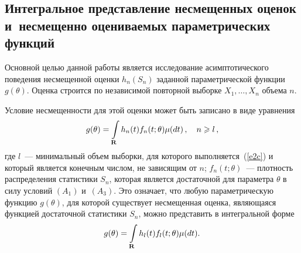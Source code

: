 \begin{multicols}{2}
\section{Интегральное представление несмещенных оценок
и~несмещенно оцениваемых параметрических функций}

  Основной целью данной работы является исследование
  асимптотического поведения несмещенной оценки $h_n(S_n)$ заданной
  параметрической функции $g(\theta)$. Оценка  строится по
  независимой повторной выборке $X_1,\ldots,X_n$ объема $n$.

   Условие несмещенности для этой оценки может быть записано
  в виде уравнения
\begin{equation}
g(\theta)=\int\limits_{\bf R} h_n(t) f_n(t;\theta) \mu(dt)\,,\quad n\geqslant l\,,
   \label{e2c}
\end{equation}
  где $l$~--- минимальный объем выборки, для которого выполняется~(\ref{e2c})
  и который является конечным числом, не зависящим от $n$;
  $f_n(t;\theta)$~--- плотность распределения статистики $S_n$, которая
  является достаточной для параметра $\theta$ в силу условий $(A_1)$ 
  и~$(A_3)$.
  Это означает, что любую параметрическую функцию
  $g(\theta)$, для которой существует несмещенная оценка, являющаяся
  функцией достаточной статистики $S_n$, можно представить в интегральной форме
  \begin{equation} 
g(\theta)=\int\limits_{\bf R} h_l(t) f_l(t;\theta) \mu(dt).
      \label{e3c}
  \end{equation}


\end{multicols}
